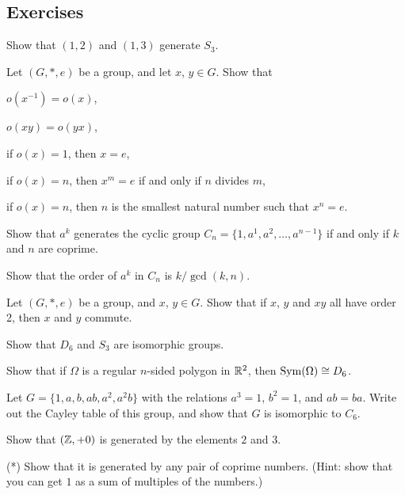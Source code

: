 \subsection*{Exercises}

\begin{exercises}
  \item Show that $(1,2)$ and $(1,3)$ generate $S_{3}$.
  
  \item Let $(G, \ast, e)$ be a group, and let $x$, $y \in G$.  Show that
    \begin{theoremenum}
      \item $o(x^{-1}) = o(x)$,

      \item $o(xy) = o(yx)$,

      \item if $o(x) = 1$, then $x = e$,
      
      \item if $o(x) = n$, then $x^{m} = e$ if and only if $n$ divides $m$,
      
      \item if $o(x) = n$, then $n$ is the smallest natural number such that $x^{n} = e$.
    \end{theoremenum}
  
  \item Show that $a^{k}$ generates the cyclic group $C_{n} = \{1, a^{1},
    a^{2}, \ldots, a^{n-1}\}$ if and only if $k$ and $n$ are coprime.
    
    Show that the order of $a^{k}$ in $C_{n}$ is $k/\gcd(k,n)$.
   
  \item Let $(G, \ast, e)$ be a group, and $x$, $y \in G$.  Show that if $x$,
    $y$ and $xy$ all have order 2, then $x$ and $y$ commute.
  
  \item Show that $D_{6}$ and $S_{3}$ are isomorphic groups.
  
  \item Show that if $\Omega$ is a regular $n$-sided polygon in 
    $\mathbb{R}^{2}$, then $\operatorname{Sym}(\Omega) \cong D_{6}$.
  
  \item Let $G = \{1, a, b, ab, a^{2}, a^{2}b\}$ with the relations $a^{3} = 1$,
    $b^{2} = 1$, and $ab = ba$.  Write out the Cayley table of this group, and
    show that $G$ is isomorphic to $C_{6}$.
  
  \item Show that $(\mathbb{Z}, + 0)$ is generated by the elements $2$ 
    and $3$.
    
    (*) Show that it is generated by any pair of coprime numbers.  
    (Hint: show that you can get $1$ as a sum of multiples of the 
    numbers.)
\end{exercises}

